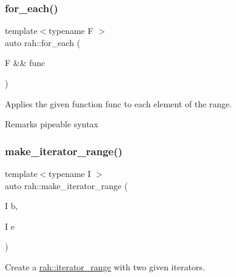 \subsubsection{\texorpdfstring{for\_each()}{for\_each()}\hspace{0.1cm}{\footnotesize\ttfamily [2/2]}}
{\footnotesize\ttfamily template$<$typename F $>$ \\
auto rah\+::for\+\_\+each (\begin{DoxyParamCaption}\item[{F \&\&}]{func }\end{DoxyParamCaption})}



Applies the given function func to each element of the range. 

\begin{DoxyRemark}{Remarks}
pipeable syntax
\end{DoxyRemark}

\begin{DoxyCodeInclude}{0}
\end{DoxyCodeInclude}
\mbox{\label{namespacerah_a0a3dd43bb465c99137bfdebb2292b102}} 
\subsubsection{\texorpdfstring{make\_iterator\_range()}{make\_iterator\_range()}}
{\footnotesize\ttfamily template$<$typename I $>$ \\
auto rah\+::make\+\_\+iterator\+\_\+range (\begin{DoxyParamCaption}\item[{I}]{b,  }\item[{I}]{e }\end{DoxyParamCaption})}



Create a \mbox{\hyperlink{structrah_1_1iterator__range}{rah\+::iterator\+\_\+range}} with two given iterators. 

